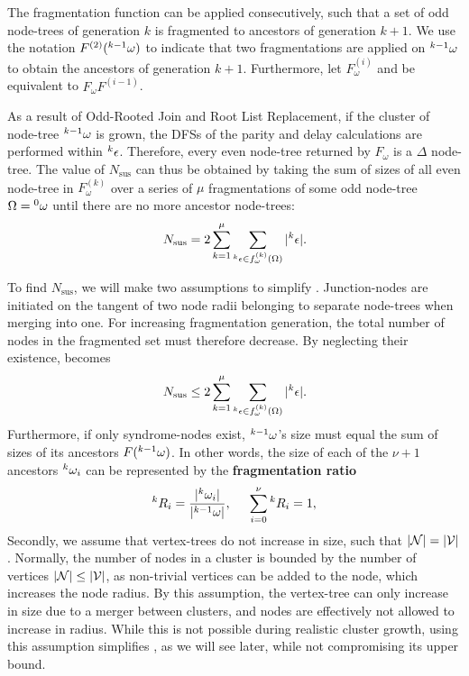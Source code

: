 The fragmentation function can be applied consecutively, such that a set of odd node-trees of generation $k$ is fragmented to ancestors of generation $k+1$. We use the notation $F^{(2)}({}^{k-1}\omega)$ to indicate that two fragmentations are applied on ${}^{k-1}\omega$ to obtain the ancestors of generation $k+1$. Furthermore, let $F_\omega^{(i)}$ and be equivalent to $F_\omega F^{(i-1)}$. 

As a result of Odd-Rooted Join and Root List Replacement, if the cluster of node-tree ${}^{k-1}\omega$ is grown, the DFSs of the parity and delay calculations are performed within ${}^{k}\epsilon$. Therefore, every even node-tree returned by $F_\omega$ is a $\Delta$ node-tree. The value of $N_{\text{sus}}$ can thus be obtained by taking the sum of sizes of all even node-tree in $F_\omega^{(k)}$ over a series of $\mu$ fragmentations of some odd node-tree $\Omega = {}^{0}\omega$ until there are no more ancestor node-trees:
\begin{equation}\label{eq:npdc}
  N_{\text{sus}} = 2\sum_{k=1}^\mu{ \sum_{ \pr{k}\epsilon \in f_\omega^{(k)}(\Omega) }{ \abs{\pr{k}\epsilon}} }.
\end{equation}

To find $N_{\text{sus}}$, we will make two assumptions to simplify . Junction-nodes are initiated on the tangent of two node radii belonging to separate node-trees when merging into one. For increasing fragmentation generation, the total number of nodes in the fragmented set must therefore decrease. By neglecting their existence,  becomes
\begin{equation}\label{eq:npdc2}
  N_{\text{sus}} \leq 2\sum_{k=1}^\mu{ \sum_{ \pr{k}\epsilon \in f_\omega^{(k)}(\Omega) }{ \abs{\pr{k}\epsilon}} }.
\end{equation}
Furthermore, if only syndrome-nodes exist, ${}^{k-1}\omega$'s size must equal the sum of sizes of its ancestors $F({}^{k-1}\omega)$. In other words, the size of each of the $\nu+1$ ancestors ${}^{k}\omega_i$ can be represented by the \textbf{fragmentation ratio}
\begin{equation}\label{eq:ratio}
  \pr{k}R_i = \frac{\abs{\pr{k}\omega_i}}{\abs{\pr{k-1}\omega}}, \hspace{0.5cm} \sum_{i=0}^{\nu}{\pr{k}R_i} = 1,
\end{equation}
Secondly, we assume that vertex-trees do not increase in size, such that $\lvert\mathcal{N}\rvert=\lvert\mathcal{V}\rvert$. Normally, the number of nodes in a cluster is bounded by the number of vertices $\lvert\mathcal{N}\rvert\leq \lvert\mathcal{V}\rvert$, as non-trivial vertices can be added to the node, which increases the node radius. By this assumption, the vertex-tree can only increase in size due to a merger between clusters, and nodes are effectively not allowed to increase in radius. While this is not possible during realistic cluster growth, using this assumption simplifies , as we will see later, while not compromising its upper bound. 

